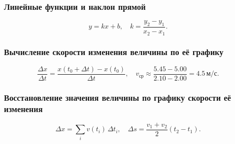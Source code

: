 \documentclass[12pt, a4paper]{article}
\begin{document}
\subsubsection*{Линейные функции и наклон прямой}
\[
y = kx + b,
\quad
k = \frac{y_2 - y_1}{x_2 - x_1}.
\]

\subsubsection*{Вычисление скорости изменения величины по её графику}
\[
\frac{\Delta x}{\Delta t} = \frac{x(t_0+\Delta t) - x(t_0)}{\Delta t},
\quad
v_\text{ср} \approx \frac{5.45 - 5.00}{2.10 - 2.00} = 4.5\,\mathrm{м/с}.
\]

\subsubsection*{Восстановление значения величины по графику скорости её изменения}
\[
\Delta x = \sum_i v(t_i)\,\Delta t_i,
\quad
\Delta s = \frac{v_1 + v_2}{2}(t_2 - t_1).
\]
\end{document}
